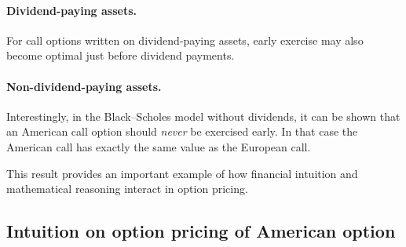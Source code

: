 \documentclass[11pt]{article}
\theoremstyle{definition}
\theoremstyle{plain}
\begin{document}
\paragraph{Dividend-paying assets.}
For call options written on dividend-paying assets, early exercise may
also become optimal just before dividend payments.

\paragraph{Non-dividend-paying assets.}
Interestingly, in the Black--Scholes model without dividends,
it can be shown that an American call option should \emph{never}
be exercised early.
In that case the American call has exactly the same value as the
European call.

This result provides an important example of how financial intuition
and mathematical reasoning interact in option pricing.


\subsection{Intuition on option pricing of American option}
\end{document}
